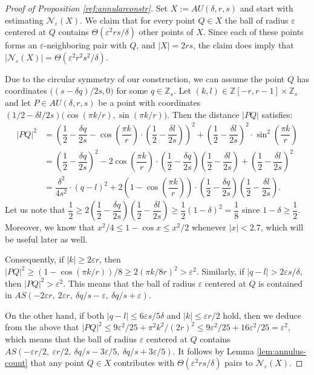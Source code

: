 \documentclass[12pt]{article}
\newcommand{\eps}{\varepsilon}
\begin{document}
\begin{proof}[Proof of Proposition \ref{ref:annularconstr}]
Set $X:= AU(\delta,r,s)$ and start with estimating $\mathcal{N}_\eps(X)$. We claim that for every point $Q\in X$ the ball of radius $\eps$ centered at $Q$ contains $\Theta\left(\eps^2rs/\delta\right)$ other points of $X$. Since each of these points forms an $\eps$-neighboring pair with $Q$, and $|X|=2rs$, the claim does imply that $|\mathcal{N}_\eps(X)|=\Theta\left(\eps^2r^2s^2/\delta\right)$.

Due to the circular symmetry of our construction, we can assume the point $Q$ has coordinates $\big((s-\delta q)/2s,0\big)$ for some $q\in \mathbb{Z}_s$. Let $(k,l)\in  \mathbb{Z}[-r,r-1] \times \mathbb{Z}_s$ and let $P\in AU(\delta,r,s)$ be a point with coordinates
$(1/2-\delta l/2s)\big(\cos(\pi k/r),\sin(\pi k/r)\big)$. Then the distance $|PQ|$ satisfies: 
    \begin{align*}
        |PQ|^2 &= \left(\dfrac{1}{2}-\dfrac{\delta q}{2s}-\cos\left(\dfrac{\pi k}{r}\right)\cdot \left(\dfrac{1}{2}-\dfrac{\delta l}{2s}\right)\right)^2 +\left(\dfrac{1}{2}-\dfrac{\delta l}{2s}\right)^2\cdot \sin^2\left(\dfrac{\pi k}{r}\right) \\
         &=  \left(\dfrac{1}{2}-\dfrac{\delta q}{2s}\right)^2 - 2\cos\left(\dfrac{\pi k}{r}\right)\cdot \left(\dfrac{1}{2}-\dfrac{\delta q}{2s}\right)\left(\dfrac{1}{2}-\dfrac{\delta l}{2s}\right) + \left(\dfrac{1}{2}-\dfrac{\delta l}{2s}\right)^2\\
         &= \dfrac{\delta^2}{4s^2}\cdot (q-l)^2 + 2\left(1-\cos\left(\dfrac{\pi k}{r}\right)\right)\cdot \left(\dfrac{1}{2}-\dfrac{\delta q}{2s}\right)\left(\dfrac{1}{2}-\dfrac{\delta l}{2s}\right).
    \end{align*}
   \indent Let us note that $\dfrac{1}{2}\geq 2\left(\dfrac{1}{2}-\dfrac{\delta q}{2s}\right)\left(\dfrac{1}{2}-\dfrac{\delta l}{2s}\right)\geq\dfrac{1}{2}(1-\delta)^2=\dfrac{1}{8}$ since $1-\delta\geq \dfrac{1}{2}$. Moreover, we know that $x^2/4\leq 1-\cos x\leq x^2/2$ whenever $|x|<2.7$, which will be useful later as well. 
 
 Consequently, if $|k|\geq 2\varepsilon r$, then $|PQ|^2\geq (1-\cos(\pi k/r))/8\geq 2(\pi k/8r)^2>\varepsilon^2$. Similarly, if $|q-l|>2\varepsilon s/\delta$, then $|PQ|^2>\varepsilon^2$. This means that the ball of radius $\eps$ centered at $Q$ is contained in $AS(-2\eps r,\ 2\eps r,\ \delta q/s-\eps,\ \delta q/s +\eps)$. 
 
  On the other hand, if both $|q-l|\leq 6\eps s/5\delta$ and $|k|\leq \eps r/2$ hold, then we deduce from the above that $|PQ|^2\leq 9\eps^2/25 +\pi^2k^2/(2r)^2\leq 9\eps^2/25+16\eps^2/25=\eps^2$, which means that the ball of radius $\eps$ centered at $Q$ contains $AS(-\eps r/2,\ \eps r/2,\ \delta q/s-3\eps/5,\ \delta q/s+3\eps/5)$. It follows by Lemma \ref{lem:annulus-count} that any point $Q\in X$ contributes with $\Theta\left(\eps^2rs/\delta\right)$ pairs to $\mathcal{N}_{\eps}(X)$.


\end{proof}
\end{document}
